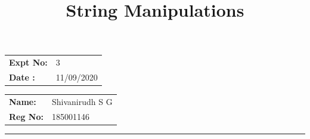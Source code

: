 \documentclass[12pt,a4paper]{article}
\title{\bf String Manipulations}
\author{\vspace{-10ex}}
\date{\vspace{-10ex}}
\begin{document}
\maketitle

\begin{minipage}{0.45\textwidth}
        \begin{tabular}{l l}
            \textbf{Expt No:}&3\\
            \textbf{Date :}&11/09/2020
        \end{tabular}
\end{minipage}%
\begin{minipage}{0.45\textwidth}
        \begin{tabular}{l l}
             \textbf{Name:}& Shivanirudh S G  \\
             \textbf{Reg No:} & 185001146 
        \end{tabular}
\end{minipage}
\vspace{1cm}
\hrule
\end{document}
